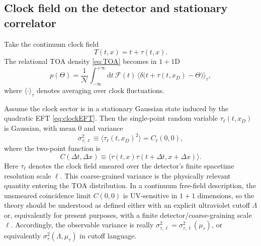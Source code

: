 \documentclass[pdflatex,sn-mathphys-num]{sn-jnl}
\theoremstyle{thmstylethree}
\theoremstyle{thmstyleone}
\theoremstyle{thmstyletwo}
\numberwithin{equation}{section}
\newcommand{\dd}{\mathrm{d}}
\newcommand{\F}{\mathcal{F}}
\begin{document}
    \subsection{Clock field on the detector and stationary correlator}
        
        Take the continuum clock field
        \begin{equation}
            T(t,x)=t+\tau(t,x).
        \end{equation}
        The relational TOA density \eqref{eq:TOA} becomes in $1+1$D
        \begin{equation}
            p(\Theta)=\frac{1}{\mathcal{N}}\int_{-\infty}^{+\infty}\dd t\,
            \F(t)\,
            \Big\langle \delta\!\big(t+\tau(t,x_D)-\Theta\big)\Big\rangle_{\tau},
            \label{eq:pThetaAvg}
        \end{equation}
        where $\langle\cdot\rangle_\tau$ denotes averaging over clock fluctuations.
        
        Assume the clock sector is in a stationary Gaussian state induced by the quadratic EFT \eqref{eq:clockEFT}. Then the single-point random variable $\tau_\ell(t,x_D)$ is Gaussian, with mean $0$ and variance
        \begin{equation}
            \sigma_{\tau,\ell}^2 \equiv \langle \tau_\ell(t,x_D)^2\rangle = C_\ell(0,0),
        \end{equation}
        where the two-point function is
        \begin{equation}
            C(\Delta t,\Delta x)\equiv \langle \tau(t,x)\tau(t+\Delta t,x+\Delta x)\rangle .
        \end{equation}
        Here $\tau_\ell$ denotes the clock field smeared over the detector's finite spacetime resolution scale $\ell$. This coarse-grained variance is the physically relevant quantity entering the TOA distribution. In a continuum free-field description, the unsmeared coincidence limit $C(0,0)$ is UV-sensitive in $1+1$ dimensions, so the theory should be understood as defined either with an explicit ultraviolet cutoff $\Lambda$ or, equivalently for present purposes, with a finite detector/coarse-graining scale $\ell$. Accordingly, the observable variance is really $\sigma_{\tau,\ell}^2=\sigma_{\tau,\ell}^2(\mu_\tau)$, or equivalently $\sigma_\tau^2(\Lambda,\mu_\tau)$ in cutoff language.
        
\end{document}
